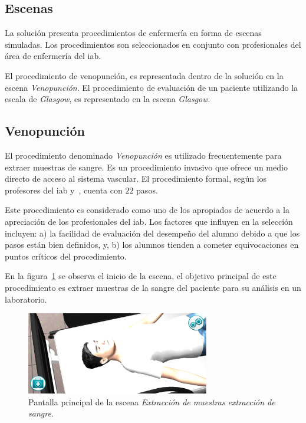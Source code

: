 \subsection{Escenas}

La solución presenta procedimientos de enfermería en forma de escenas simuladas.
Los procedimientos son seleccionados en conjunto con profesionales del área de
enfermería del \gls{iab}. 

El procedimiento de venopunción, es representada dentro de la solución en la
escena \emph{Venopunción}. El procedimiento de evaluación de un paciente
utilizando la escala de \textit{Glasgow}, es representado en la escena
\emph{Glasgow}.

\subsection{Venopunción}

El procedimiento denominado \emph{Venopunción} es utilizado frecuentemente para
extraer muestras de sangre. Es un procedimiento invasivo que ofrece un medio
directo de acceso al sistema vascular. El procedimiento formal, según los
profesores del \gls{iab} y~\cite{oms:extraccion}, cuenta con $22$ pasos.

Este procedimiento es considerado como uno de los apropiados de acuerdo a la
apreciación de los profesionales del \Gls{iab}. 
Los factores que influyen en la selección incluyen: 
a) la facilidad de evaluación del desempeño del alumno debido a que los pasos
están bien definidos, y, 
b) los alumnos tienden a cometer equivocaciones en puntos críticos del
procedimiento.

En la figura~\ref{fig:hemocultivo_principal} se observa el inicio de la escena,
el objetivo principal de este procedimiento es extraer muestras de la sangre del
paciente para su análisis en un laboratorio.

\begin{figure} 
\centering 
\includegraphics[width=8cm]{../solucion/images/hemocultivo_principal.jpg}
\caption{Pantalla principal de la escena \emph{Extracción de muestras extracción
        de sangre}.}
\label{fig:hemocultivo_principal}
\end{figure}

